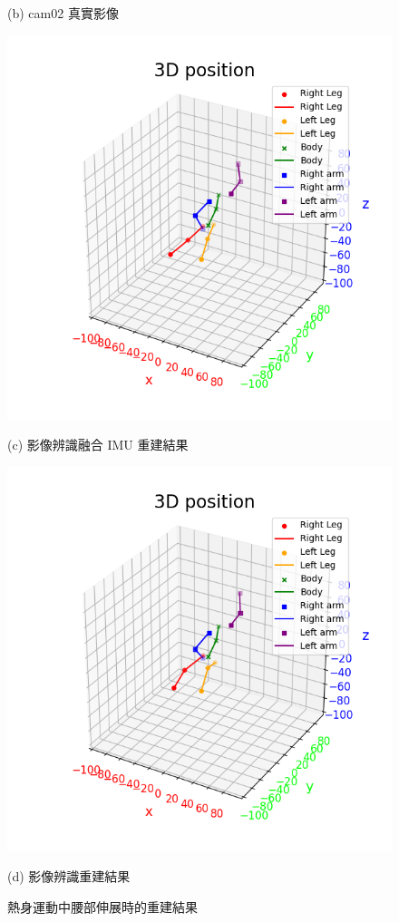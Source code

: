 \begin{figure}[!ht]
\begin{minipage}{.5\textwidth}
       \caption*{(b) cam02 真實影像}
    \end{minipage}
    \begin{minipage}{.5\textwidth}
       \centering
       \includegraphics[width=.95\linewidth]{figure/ch4_fig_warm_result_with1.png}
       \caption*{(c) 影像辨識融合 IMU 重建結果}
    \end{minipage}%
    \begin{minipage}{.5\textwidth}
       \centering
       \includegraphics[width=.95\linewidth]{figure/ch4_fig_warm_result_no1.png}
       \caption*{(d) 影像辨識重建結果}
    \end{minipage}
   \caption[熱身運動中腰部伸展時的重建結果]{熱身運動中腰部伸展時的重建結果}
   \label{ch4_fig_warm_warm}
\end{figure}

